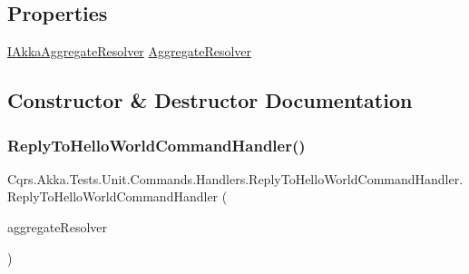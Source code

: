 \subsection*{Properties}
\begin{DoxyCompactItemize}
\item 
\hyperlink{interfaceCqrs_1_1Akka_1_1Domain_1_1IAkkaAggregateResolver}{I\+Akka\+Aggregate\+Resolver} \hyperlink{classCqrs_1_1Akka_1_1Tests_1_1Unit_1_1Commands_1_1Handlers_1_1ReplyToHelloWorldCommandHandler_a2c8f8e4cdceffd4a586f6f7a00962ca6_a2c8f8e4cdceffd4a586f6f7a00962ca6}{Aggregate\+Resolver}
\end{DoxyCompactItemize}


\subsection{Constructor \& Destructor Documentation}
\mbox{\label{classCqrs_1_1Akka_1_1Tests_1_1Unit_1_1Commands_1_1Handlers_1_1ReplyToHelloWorldCommandHandler_ac3c6ef2299fded8533f7e013e6cf763d_ac3c6ef2299fded8533f7e013e6cf763d}} 
\subsubsection{\texorpdfstring{Reply\+To\+Hello\+World\+Command\+Handler()}{ReplyToHelloWorldCommandHandler()}}
{\footnotesize\ttfamily Cqrs.\+Akka.\+Tests.\+Unit.\+Commands.\+Handlers.\+Reply\+To\+Hello\+World\+Command\+Handler.\+Reply\+To\+Hello\+World\+Command\+Handler (\begin{DoxyParamCaption}\item[{\hyperlink{interfaceCqrs_1_1Akka_1_1Domain_1_1IAkkaAggregateResolver}{I\+Akka\+Aggregate\+Resolver}}]{aggregate\+Resolver }\end{DoxyParamCaption})}



